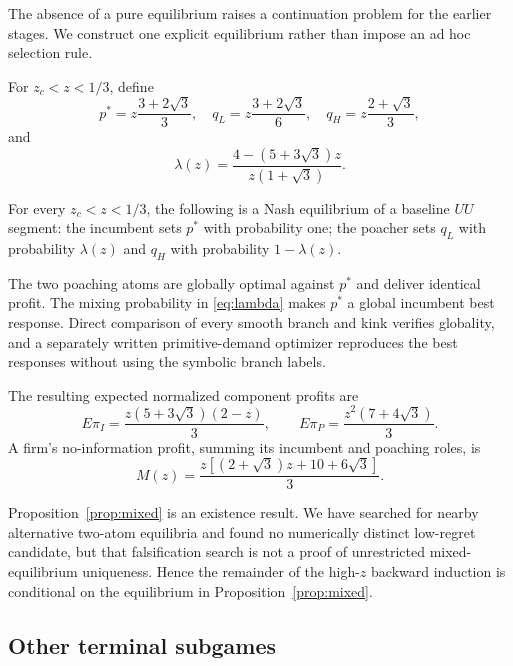The absence of a pure equilibrium raises a continuation problem for the earlier stages.  We construct one explicit equilibrium rather than impose an ad hoc selection rule.

For \(z_c<z<1/3\), define
\begin{equation}
p^*=z\frac{3+2\sqrt3}{3},
\quad
q_L=z\frac{3+2\sqrt3}{6},
\quad
q_H=z\frac{2+\sqrt3}{3},
\label{eq:mixedprices}
\end{equation}
and
\begin{equation}
\lambda(z)
=\frac{4-(5+3\sqrt3)z}{z(1+\sqrt3)}.
\label{eq:lambda}
\end{equation}

\begin{proposition}\label{prop:mixed}
For every \(z_c<z<1/3\), the following is a Nash equilibrium of a baseline \(UU\) segment: the incumbent sets \(p^*\) with probability one; the poacher sets \(q_L\) with probability \(\lambda(z)\) and \(q_H\) with probability \(1-\lambda(z)\).
\end{proposition}

The two poaching atoms are globally optimal against \(p^*\) and deliver identical profit.  The mixing probability in \eqref{eq:lambda} makes \(p^*\) a global incumbent best response.  Direct comparison of every smooth branch and kink verifies globality, and a separately written primitive-demand optimizer reproduces the best responses without using the symbolic branch labels.

The resulting expected normalized component profits are
\begin{equation}
E\pi_I=
\frac{z(5+3\sqrt3)(2-z)}{3},
\qquad
E\pi_P=
\frac{z^2(7+4\sqrt3)}{3}.
\label{eq:mixedcomponentprofit}
\end{equation}
A firm's no-information profit, summing its incumbent and poaching roles, is
\begin{equation}
M(z)=
\frac{z[(2+\sqrt3)z+10+6\sqrt3]}{3}.
\label{eq:M}
\end{equation}

Proposition~\ref{prop:mixed} is an existence result.  We have searched for nearby alternative two-atom equilibria and found no numerically distinct low-regret candidate, but that falsification search is not a proof of unrestricted mixed-equilibrium uniqueness.  Hence the remainder of the high-\(z\) backward induction is conditional on the equilibrium in Proposition~\ref{prop:mixed}.

\subsection{Other terminal subgames}

